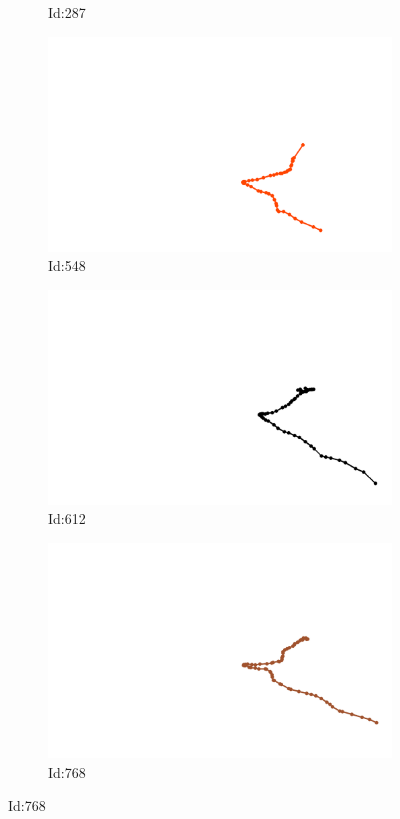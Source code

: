 \documentclass[12pt,twoside]{report}
\begin{document}
\begin{figure}
\begin{subfigure}[b]{0.20\textwidth}
\caption{Id:287}
\end{subfigure}
\begin{subfigure}[b]{0.20\textwidth}
\centering
\includegraphics[width=\textwidth]{../../trajectories/548.png}
\caption{Id:548}
\end{subfigure}
\begin{subfigure}[b]{0.20\textwidth}
\centering
\includegraphics[width=\textwidth]{../../trajectories/612.png}
\caption{Id:612}
\end{subfigure}
\begin{subfigure}[b]{0.20\textwidth}
\centering
\includegraphics[width=\textwidth]{../../trajectories/768.png}
\caption{Id:768}
\end{subfigure}
\end{figure}
\end{document}
